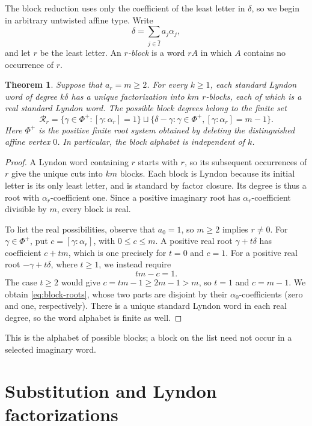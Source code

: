 \documentclass[11pt]{amsart}
\numberwithin{equation}{section}
\newtheorem{theorem}{Theorem}[section]
\theoremstyle{definition}
\begin{document}
The block reduction uses only the coefficient of the least letter in $\delta$, so we begin in arbitrary untwisted affine type. Write
\[
 \delta=\sum_{j\in\widehat I}a_j\alpha_j,
\]
and let $r$ be the least letter. An \emph{$r$-block} is a word $rA$ in which $A$ contains no occurrence of $r$.

\begin{theorem}\label{thm:finite-blocks}
Suppose that $a_r=m\geq2$. For every $k\geq1$, each standard Lyndon word of degree $k\delta$ has a unique factorization into $km$ $r$-blocks, each of which is a real standard Lyndon word. The possible block degrees belong to the finite set
\begin{equation}\label{eq:block-roots}
 \mathcal R_r=
 \{\gamma\in\Phi^+:[\gamma:\alpha_r]=1\}
 \sqcup
 \{\delta-\gamma:\gamma\in\Phi^+,
                    [\gamma:\alpha_r]=m-1\}.
\end{equation}
Here $\Phi^+$ is the positive finite root system obtained by deleting the distinguished affine vertex $0$. In particular, the block alphabet is independent of $k$.
\end{theorem}

\begin{proof}
A Lyndon word containing $r$ starts with $r$, so its subsequent occurrences of $r$ give the unique cuts into $km$ blocks. Each block is Lyndon because its initial letter is its only least letter, and is standard by factor closure. Its degree is thus a root with $\alpha_r$-coefficient one. Since a positive imaginary root has $\alpha_r$-coefficient divisible by $m$, every block is real.

To list the real possibilities, observe that $a_0=1$, so $m\geq2$ implies $r\ne0$. For $\gamma\in\Phi^+$, put $c=[\gamma:\alpha_r]$, with $0\leq c\leq m$. A positive real root $\gamma+t\delta$ has coefficient $c+tm$, which is one precisely for $t=0$ and $c=1$. For a positive real root $-\gamma+t\delta$, where $t\geq1$, we instead require
\[
 tm-c=1.
\]
The case $t\geq2$ would give $c=tm-1\geq2m-1>m$, so $t=1$ and $c=m-1$. We obtain \eqref{eq:block-roots}, whose two parts are disjoint by their $\alpha_0$-coefficients (zero and one, respectively). There is a unique standard Lyndon word in each real degree, so the word alphabet is finite as well.
\end{proof}

This is the alphabet of possible blocks; a block on the list need not occur in a selected imaginary word.

\section{Substitution and Lyndon factorizations}\label{sec:substitution}
\end{document}
